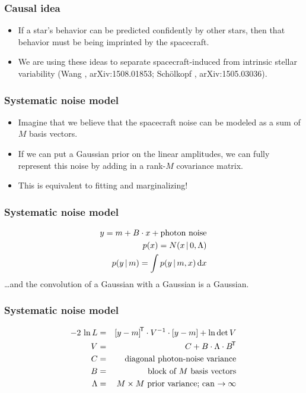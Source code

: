 \documentclass[pdftex]{beamer}
\begin{document}
\begin{frame}
  \frametitle{Causal idea}
  \begin{itemize}
  \item If a star's behavior can be predicted confidently by
    other stars, then that behavior must be being imprinted by
    the spacecraft.
  \item We are using these ideas to separate spacecraft-induced from
    intrinsic stellar variability {\footnotesize (Wang \etal, arXiv:1508.01853;
    Sch\"olkopf \etal, arXiv:1505.03036)}.
  \end{itemize}
\end{frame}

\begin{frame}
  \frametitle{Systematic noise model}
  \begin{itemize}
  \item Imagine that we believe that the spacecraft noise
    can be modeled as a sum of $M$ basis vectors.
  \item If we can put a Gaussian prior on the linear amplitudes, we
    can fully represent this noise by adding in a rank-$M$ covariance
    matrix.
  \item This is equivalent to fitting and marginalizing!
  \end{itemize}
\end{frame}

\begin{frame}
  \frametitle{Systematic noise model}
  \begin{eqnarray}
    y = m + B\cdot x + \mbox{photon noise}
    \nonumber \\
    p(x) = N(x\,|\, 0, \Lambda)
    \nonumber \\
    p(y\,|\, m) = \int p(y\,|\, m, x)\,\mathrm{d} x
  \end{eqnarray}
  \ldots and the convolution of a Gaussian with a Gaussian is a Gaussian.
\end{frame}

\begin{frame}
  \frametitle{Systematic noise model}
  \begin{eqnarray}
    -2\,\ln L &=& {[y - m]}^{\mathsf{\!T}}\cdot V^{-1}\cdot [y - m] + \ln\det V
    \nonumber \\
    V &=& C + B\cdot\Lambda\cdot{B}^{\mathsf{\!T}}
    \nonumber \\
    C &=& \mbox{diagonal photon-noise variance}
    \nonumber \\
    B &=& \mbox{block of $M$ basis vectors}
    \nonumber \\
    \Lambda &=& \mbox{$M\times M$ prior variance; can $\rightarrow\infty$}
    \nonumber
  \end{eqnarray}
\end{frame}
\end{document}
